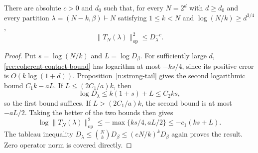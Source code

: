 \begin{corollary}\label{n:coherent-sparse-consequence}
There are absolute $c>0$ and $d_0$ such that, for every
$N=2^d$ with $d\ge d_0$ and every partition
$\lambda=(N-k,\beta)\vdash N$ satisfying
$1\le k<N$ and $\log(N/k)\ge d^{3/4}$,
\[
 \|T_N(\lambda)\|_{\mathrm{op}}^2\le D_\lambda^{-c}.
\]
\end{corollary}
\begin{proof}
Put $s=\log(N/k)$ and $L=\log D_\beta$.  For sufficiently large
$d$, \eqref{rec:coherent-contact-bound} has logarithm at most
$-ks/4$, since its positive error is $O(k\log(1+d))$.
Proposition~\ref{n:strong-tail} gives the second logarithmic bound
$C_1k-aL$.  If $L\le(2C_1/a)k$, then
\[
 \log D_\lambda\le k(1+s)+L\le C_2ks,
\]
so the first bound suffices.  If $L>(2C_1/a)k$, the second bound is
at most $-aL/2$.  Taking the better of the two bounds then gives
\[
 \log\|T_N(\lambda)\|_{\mathrm{op}}^2
 \le-\max\{ks/4,aL/2\}
 \le-c_1(ks+L).
\]
The tableau inequality
$D_\lambda\le\binom NkD_\beta\le(eN/k)^kD_\beta$
again proves the result.  Zero operator norm is covered directly.
\end{proof}
